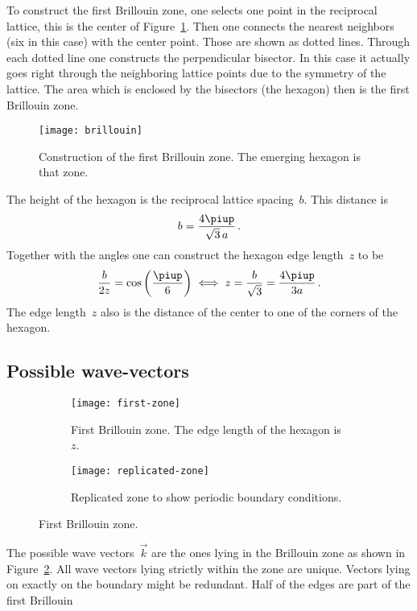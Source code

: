\documentclass[11pt, english, fleqn, DIV=15, headinclude, BCOR=1cm]{scrartcl}
\begin{document}
To construct the first Brillouin zone, one selects one point in the reciprocal
lattice, this is the center of Figure~\ref{fig:brillouin}. Then one connects
the nearest neighbors (six in this case) with the center point. Those are shown
as dotted lines. Through each dotted line one constructs the perpendicular
bisector. In this case it actually goes right through the neighboring lattice
points due to the symmetry of the lattice. The area which is enclosed by the
bisectors (the hexagon) then is the first Brillouin zone.

\begin{figure}[htbp]
    \centering
    \texttt{[image: brillouin]}
    \caption{%
        Construction of the first Brillouin zone. The emerging hexagon is that
        zone.
    }
    \label{fig:brillouin}
\end{figure}

The height of the hexagon is the reciprocal lattice spacing~$b$. This distance
is
\[
    b = \frac{4 \piup}{\sqrt 3\, a} \,.
\]
Together with the angles one can construct the hexagon edge length~$z$ to be
\[
    \frac{b}{2z} = \cos\del{\frac\piup6}
    \iff
    z = \frac{b}{\sqrt 3}
    = \frac{4 \piup}{3a} \,.
\]
The edge length~$z$ also is the distance of the center to one of the corners of
the hexagon.

\subsection{Possible wave-vectors}

\begin{figure}[htbp]
    \begin{subfigure}[c]{.3\linewidth}
        \centering
        \texttt{[image: first-zone]}
        \caption{%
            First Brillouin zone. The edge length of the hexagon is $z$.
        }
        \label{fig:first-zone}
    \end{subfigure}
    \begin{subfigure}[c]{.7\linewidth}
        \centering
        \texttt{[image: replicated-zone]}
        \caption{%
            Replicated zone to show periodic boundary conditions.
        }
        \label{fig:replicated-zone}
    \end{subfigure}
    \caption{%
        First Brillouin zone.
    }
\end{figure}

The possible wave vectors~$\vec k$ are the ones lying in the Brillouin zone as
shown in Figure~\ref{fig:first-zone}. All wave vectors lying strictly within
the zone are unique. Vectors lying on exactly on the boundary might be
redundant. Half of the edges are part of the first Brillouin
\end{document}
